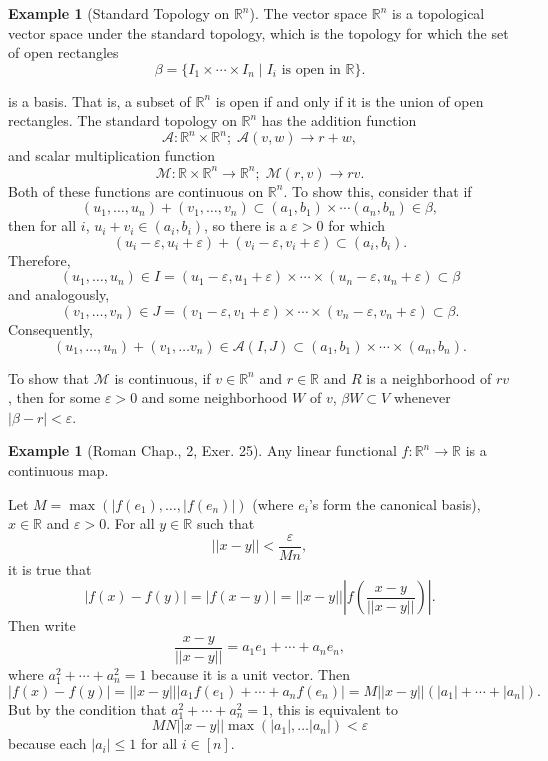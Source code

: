 \documentclass[psamsfonts]{amsart}
\theoremstyle{definition}
\newtheorem{exmp}[thm]{Example}
\theoremstyle{remark}
\numberwithin{equation}{section}
\begin{document}
\begin{exmp}[Standard Topology on $\mathbb{R}^n$]
The vector space $\mathbb{R}^n$ is a topological vector space under the standard topology, which is the topology for which the set of open rectangles 
$$\beta = \{ I_1 \times \cdots \times I_n \; | \; I_i \text{ is open in } \mathbb{R} \} . $$
\end{exmp}
is a basis. That is, a subset of $\mathbb{R}^n$ is open if and only if it is the union of open rectangles. The standard topology on $\mathbb{R}^n$ has the addition function 
$$\mathcal{A} : \mathbb{R}^ n \times \mathbb{R}^n ; \; \mathcal{A} (v, w) \rightarrow r + w, $$
and scalar multiplication function 
$$\mathcal{M} : \mathbb{R} \times \mathbb{R} ^n \rightarrow \mathbb{R}^n ; \; \mathcal{M} (r, v) \rightarrow rv.  $$
Both of these functions are continuous on $\mathbb{R}^n.$ To show this, consider
that if 
$$(u_1, \dots, u_n) + (v_1, \dots , v_n) \subset (a_1, b_1) \times \cdots (a_n , b_n) \in \beta, $$
then for all $i$, $u_i + v_i \in (a_i , b_i) $, so there is a $\varepsilon > 0 $ for which 
$$(u_i - \varepsilon , u_i + \varepsilon ) + (v_i - \varepsilon, v_i + \varepsilon) \subset (a_i, b_i). $$
Therefore,  
$$(u_1, \dots , u_n ) \in I = (u_1 - \varepsilon , u_1 + \varepsilon ) \times \cdots \times (u_n - \varepsilon , u_n + \varepsilon ) \subset \beta$$
and analogously, 
$$(v_1, \dots , v_n ) \in J = (v_1 - \varepsilon , v_1 + \varepsilon ) \times \cdots \times (v_n - \varepsilon , v_n + \varepsilon ) \subset \beta.$$
Consequently, 
$$ (u_1, \dots, u_n) + (v_1, \dots v_n ) \in \mathcal{A} (I, J) \subset (a_1, b_1) \times \cdots \times (a_n, b_n).$$

To show that $\mathcal{M}$ is continuous, if $v \in \mathbb{R}^n$ and $r \in \mathbb{R}$ and $R$ is a neighborhood of $rv$, then for some $\varepsilon > 0$ and some neighborhood $W$ of $v$, $\beta W \subset V$ whenever $|\beta - r| < \varepsilon$. 

\begin{exmp}[Roman Chap., 2, Exer. 25]
Any linear functional $f : \mathbb{R}^n \rightarrow \mathbb{R}$ is a continuous map. 

Let $M = \max (|f(e_1), \dots , |f(e_n)| )$ (where $e_i$'s form the canonical basis), $x \in \mathbb{R}$ and $\varepsilon > 0$. For all $y \in \mathbb{R}$ such that 
$$|| x- y|| < \frac{\varepsilon}{Mn}, $$
it is true that 
$$|f(x) - f(y)| = |f(x-y)| = ||x-y|| \left| f\left( \frac{x-y}{||x-y||}\right) \right|.$$
Then write 
$$\frac{x-y}{||x-y||} = a_1 e_1 + \cdots + a_n e_n, $$
where $a_1^2 + \cdots + a_n ^2 =1 $ because it is a unit vector. Then 
$$|f(x) - f(y)| = ||x-y|||a_1f(e_1) + \cdots + a_n f(e_n)| = M||x-y||(|a_1| + \cdots + |a_n|). $$
But by the condition that $a_1 ^ 2+ \cdots + a_n ^2 = 1$, this is equivalent to 
$$MN ||x-y|| \max(|a_1| , \dots |a_n|) < \varepsilon $$
because each $|a_i| \leq 1$ for all $i \in [ n].$ 
\end{exmp}
\end{document}
